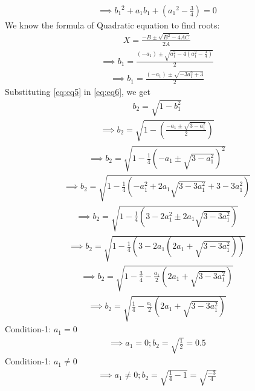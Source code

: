 \documentclass[12pt,-letter paper]{article}
\providecommand{\brak}[1]{\ensuremath{\left(#1\right)}}
\providecommand{\brak}[1]{\ensuremath{\left(#1\right)}}
\begin{document}
\begin{enumerate}
  \begin{align}
 \implies {b_1}^2+{a_1b_1}+\brak{{a_1}^2-\frac{3}{4}}=0
  \end{align}
  We know the formula of Quadratic equation to find roots: 
  \begin{align}
   X = \frac{-B \pm \sqrt{B^2 - 4AC}}{2A}
\end{align} 
\begin{align}
\implies  b_1 = \frac{(-a_1) \pm \sqrt{a_1^2 - 4(a_1^2-\frac{3}{4})}}{2}
  \end{align}  
  \begin{align}
\implies  b_1 = \frac{ (-a_1)\pm \sqrt{-3a_1^2+3}}{2}
\label{eq:eq5}
  \end{align}
  Substituting \eqref{eq:eq5} in \eqref{eq:eq6}, we get
  \begin{align}
b_2=\sqrt{1-b_1^2}
  \end{align}
  \begin{align}
    \implies b_2=\sqrt{1-\brak{\frac{-a_1 \pm \sqrt{3-a_1^2}}{2}}}
    \end{align}
     \begin{align}
 \implies b_2=\sqrt{1-\frac{1}{4}\brak{-a_1 \pm \sqrt{3-a_1^2}}^2}
 \end{align}
 \begin{align}
  \implies b_2= \sqrt{1-\frac{1}{4}\brak{-a_1^2 + 2a_1\sqrt{3-3a_1^2}+3-3a_1^2}}
   \end{align}
   \begin{align}
   \implies  b_2= \sqrt{1-\frac{1}{4}\brak{3-2a_1^2 \pm 2a_1\sqrt{3-3a_1^2}}}
     \end{align}
   \begin{align}
   \implies  b_2= \sqrt{1-\frac{1}{4}\brak{3-2a_1 \brak{2a_1+\sqrt{3-3a_1^2}}}}
   \end{align}
   \begin{align}
   \implies b_2=\sqrt{1-\frac{3}{4}-\frac{a_1}{2}\brak{2a_1 + \sqrt{3-3a_1^2}}}
   \end{align}
     \begin{align}
     \implies b_2= \sqrt{\frac{1}{4}-\frac{a_1}{2}\brak{2a_1+\sqrt{3-3a_1^2}}}
     \label{eq:eq11}
      \end{align}
       Condition-1: $a_1=0$
      \begin{align}
     \implies a_1=0;   b_2=\sqrt{\frac{1}{2}}=0.5
     \end{align}
     Condition-1: $a_1 \neq 0$
      \begin{align}
     \implies a_1 \neq 0;   b_2=\sqrt{\frac{1}{4}-1} = \sqrt{\frac{-3}{4}}

\end{align}
\end{enumerate}
\end{document}

